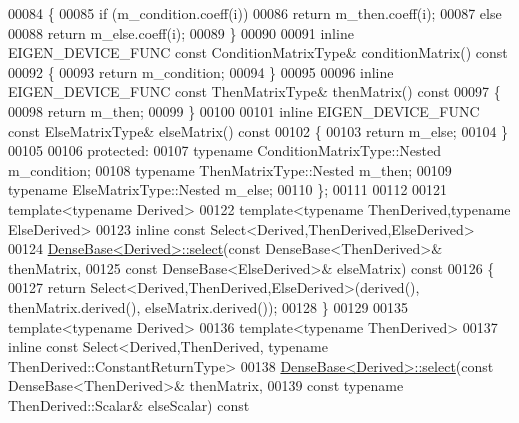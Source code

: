 \begin{DoxyCode}
00084 \textcolor{keyword}{    }\{
00085       \textcolor{keywordflow}{if} (m\_condition.coeff(i))
00086         \textcolor{keywordflow}{return} m\_then.coeff(i);
00087       \textcolor{keywordflow}{else}
00088         \textcolor{keywordflow}{return} m\_else.coeff(i);
00089     \}
00090 
00091     \textcolor{keyword}{inline} EIGEN\_DEVICE\_FUNC \textcolor{keyword}{const} ConditionMatrixType& conditionMatrix()\textcolor{keyword}{ const}
00092 \textcolor{keyword}{    }\{
00093       \textcolor{keywordflow}{return} m\_condition;
00094     \}
00095 
00096     \textcolor{keyword}{inline} EIGEN\_DEVICE\_FUNC \textcolor{keyword}{const} ThenMatrixType& thenMatrix()\textcolor{keyword}{ const}
00097 \textcolor{keyword}{    }\{
00098       \textcolor{keywordflow}{return} m\_then;
00099     \}
00100 
00101     \textcolor{keyword}{inline} EIGEN\_DEVICE\_FUNC \textcolor{keyword}{const} ElseMatrixType& elseMatrix()\textcolor{keyword}{ const}
00102 \textcolor{keyword}{    }\{
00103       \textcolor{keywordflow}{return} m\_else;
00104     \}
00105 
00106   \textcolor{keyword}{protected}:
00107     \textcolor{keyword}{typename} ConditionMatrixType::Nested m\_condition;
00108     \textcolor{keyword}{typename} ThenMatrixType::Nested m\_then;
00109     \textcolor{keyword}{typename} ElseMatrixType::Nested m\_else;
00110 \};
00111 
00112 
00121 \textcolor{keyword}{template}<\textcolor{keyword}{typename} Derived>
00122 \textcolor{keyword}{template}<\textcolor{keyword}{typename} ThenDerived,\textcolor{keyword}{typename} ElseDerived>
00123 \textcolor{keyword}{inline} \textcolor{keyword}{const} Select<Derived,ThenDerived,ElseDerived>
00124 \hyperlink{group___core___module_a65e78cfcbc9852e6923bebff4323ddca}{DenseBase<Derived>::select}(\textcolor{keyword}{const} DenseBase<ThenDerived>& thenMatrix,
00125                             \textcolor{keyword}{const} DenseBase<ElseDerived>& elseMatrix)\textcolor{keyword}{ const}
00126 \textcolor{keyword}{}\{
00127   \textcolor{keywordflow}{return} Select<Derived,ThenDerived,ElseDerived>(derived(), thenMatrix.derived(), elseMatrix.derived());
00128 \}
00129 
00135 \textcolor{keyword}{template}<\textcolor{keyword}{typename} Derived>
00136 \textcolor{keyword}{template}<\textcolor{keyword}{typename} ThenDerived>
00137 \textcolor{keyword}{inline} \textcolor{keyword}{const} Select<Derived,ThenDerived, typename ThenDerived::ConstantReturnType>
00138 \hyperlink{group___core___module_a65e78cfcbc9852e6923bebff4323ddca}{DenseBase<Derived>::select}(\textcolor{keyword}{const} DenseBase<ThenDerived>& thenMatrix,
00139                            \textcolor{keyword}{const} \textcolor{keyword}{typename} ThenDerived::Scalar& elseScalar)\textcolor{keyword}{ const}

\end{DoxyCode}
